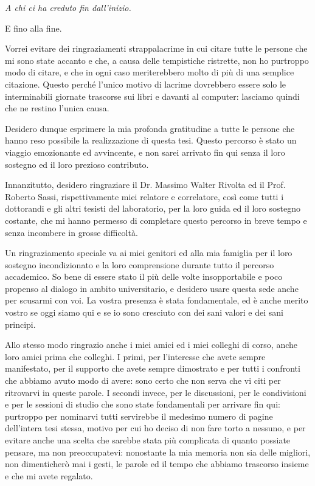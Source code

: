 \documentclass[12pt,italian]{report}
\newcommand\blankpage{
    \null
    \thispagestyle{empty}
    \addtocounter{page}{-1}
    \newpage}
\begin{document}
\afterpage{\blankpage}
\frontespizio
\afterpage{\blankpage}
\beforepreface

{\raggedleft \large \sl A chi ci ha creduto fin dall'inizio. \\

    \bigskip

    E fino alla fine. \\}


Vorrei evitare dei ringraziamenti strappalacrime in cui citare tutte le persone
che mi sono state accanto e che, a causa delle tempistiche ristrette, non ho purtroppo modo di citare, e che in ogni caso meriterebbero molto di più di una semplice citazione. Questo perché l’unico motivo di lacrime dovrebbero essere solo le interminabili giornate trascorse sui libri e davanti al computer: lasciamo quindi che ne restino l'unica causa.

Desidero dunque esprimere la mia profonda gratitudine a tutte le persone che hanno reso possibile la realizzazione di questa tesi. Questo percorso è stato un viaggio emozionante ed avvincente, e non sarei arrivato fin qui senza il loro sostegno ed il loro prezioso contributo.

Innanzitutto, desidero ringraziare il Dr. Massimo Walter Rivolta ed il Prof. Roberto Sassi, rispettivamente miei relatore e correlatore, così come tutti i dottorandi e gli altri tesisti del laboratorio, per la loro guida ed il loro sostegno costante, che mi hanno permesso di completare questo percorso in breve tempo e senza incombere in grosse difficoltà.

Un ringraziamento speciale va ai miei genitori ed alla mia famiglia per il loro sostegno incondizionato e la loro comprensione durante tutto il percorso accademico. So bene di essere stato il più delle volte insopportabile e poco propenso al dialogo in ambito universitario, e desidero usare questa sede anche per scusarmi con voi. La vostra presenza è stata fondamentale, ed è anche merito vostro se oggi siamo qui e se io sono cresciuto con dei sani valori e dei sani principi.

Allo stesso modo ringrazio anche i miei amici ed i miei colleghi di corso, anche loro amici prima che colleghi. I primi, per l'interesse che avete sempre manifestato, per il supporto che avete sempre dimostrato e per tutti i confronti che abbiamo avuto modo di avere: sono certo che non serva che vi citi per ritrovarvi in queste parole. I secondi invece, per le discussioni, per le condivisioni e per le sessioni di studio che sono state fondamentali per arrivare fin qui: purtroppo per nominarvi tutti servirebbe il medesimo numero di pagine dell'intera tesi stessa, motivo per cui ho deciso di non fare torto a nessuno, e per evitare anche una scelta che sarebbe stata più complicata di quanto possiate pensare, ma non preoccupatevi: nonostante la mia memoria non sia delle migliori, non dimenticherò mai i gesti, le parole ed il tempo che abbiamo trascorso insieme e che mi avete regalato.
\end{document}
